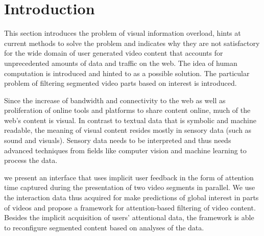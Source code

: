 \chapter{Introduction}
\label{ch:introduction}

This section introduces the problem of visual information overload, hints at current methods to solve the problem and indicates why they are not satisfactory for the wide domain of user generated video content that accounts for unprecedented amounts of data and traffic on the web. The idea of human computation is introduced and hinted to as a possible solution. The particular problem of filtering segmented video parts based on interest is introduced.

Since the increase of bandwidth and connectivity to the web as well as proliferation of online tools and platforms to share content online, much of the web's content is visual. In contrast to textual data that is symbolic and machine readable, the meaning of visual content resides mostly in sensory data (such as sound and visuals). Sensory data needs to be interpreted and thus needs advanced techniques from fields like computer vision and machine learning to process the data.


we present an interface that uses implicit user feedback in the form of attention time captured during the presentation of two video segments in parallel. We use the interaction data thus acquired for make predictions of global interest in parts of videos and propose a framework for attention-based filtering of video content. Besides the implicit acquisition of users' attentional data, the framework is able to reconfigure segmented content based on analyses of the data.




